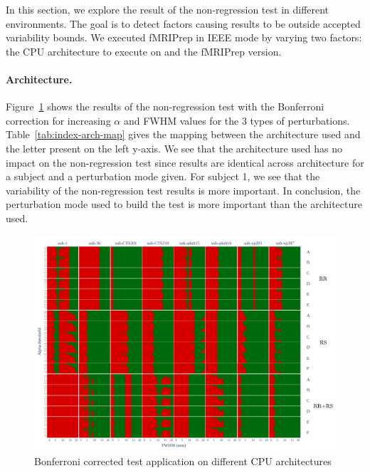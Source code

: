 \documentclass{article}
\newcommand{\fmriprep}{fMRIPrep\xspace}
\begin{document}
In this section, we explore the result of the non-regression test in different environments. The goal is to detect factors causing results to be outside accepted variability bounds. We executed \fmriprep in IEEE mode by varying two factors: the CPU architecture to execute on and the \fmriprep version.

\paragraph*{Architecture.} Figure~\ref{fig:arch_bonferroni} shows the results of the non-regression test with the Bonferroni correction for increasing $\alpha$ and FWHM values for the 3 types of perturbations. Table~\ref{tab:index-arch-map} gives the mapping between the architecture used and the letter present on the left y-axis. We see that the architecture used has no impact on the non-regression test since results are identical across architecture for a subject and a perturbation mode given. For subject 1, we see that the variability of the non-regression test results is more important. In conclusion, the perturbation mode used to build the test is more important than the architecture used.


\begin{figure}
    \centering
    \includegraphics[width=\linewidth]{figures/arch/arch_mct_fwe_bonferroni_.pdf}
    \caption{Bonferroni corrected test application on different CPU architectures}
    \label{fig:arch_bonferroni}
\end{figure}
\end{document}
